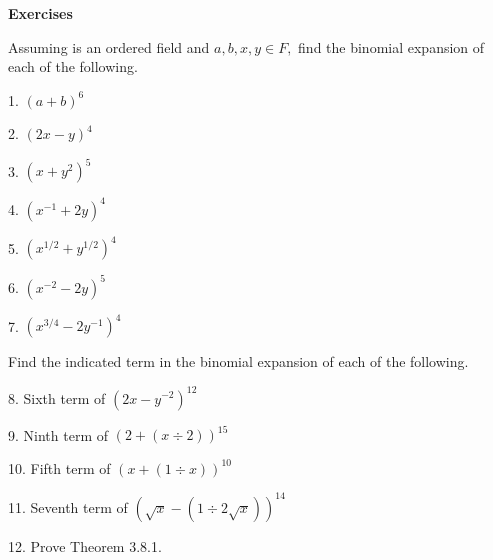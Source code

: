 \begin{large}
\newpage


\textbf{Exercises} \nl

Assuming \of is an ordered field and $a,b,x,y\in F,$ find the binomial expansion of
each of the following. \nl

1. $(a+b)^{6}$ \nl

2. $(2x-y)^{4}$ \nl

3. $(x+y^{2})^{5}$ \nl

4. $(x^{-1}+2{y})^{4}$ \nl


5. $(x^{1/2} +y^{1/2})^{4}$ \nl

6. $(x^{-2} - 2y)^{5}$\nl

7. $(x^{3/4} - 2y^{-1})^{4}$ \nl

Find the indicated term in the binomial expansion of each of the following. \nl

8. Sixth term of $(2x - y^{-2})^{12} $\nl

9. Ninth term of $(2 + (x\div 2))^{15}$\nl

10. Fifth term of $(x + (1\div x))^{10}$\nl

11. Seventh term of $(\sqrt{x} - (1\div 2\sqrt{x}))^{14}$\nl

12. Prove Theorem 3.8.1. \nl





\end{large}




